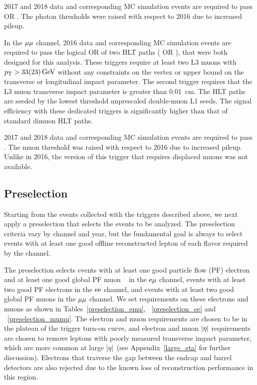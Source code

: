 2017 and 2018 data and corresponding MC simulation events are required to pass  OR  . The photon \ET thresholds were raised with respect to 2016 due to increased pileup.

In the ${\mu}{\mu}$ channel, 2016 data and corresponding MC simulation events are required to pass the logical OR of two HLT paths ( OR ), that were both designed for this analysis. These triggers require at least two L3 muons with $p_{\mathrm{T}}>33(23)\,\text{Ge\hspace{-.08em}V}$ without any constraints on the vertex or upper bound on the transverse or longitudinal impact parameter. The second trigger requires that the L3 muon transverse impact parameter is greater than 0.01~\unit{cm}. The HLT paths are seeded by the lowest \pt threshold unprescaled double-muon L1 seeds. The signal efficiency with these dedicated triggers is significantly higher than that of standard dimuon HLT paths.

2017 and 2018 data and corresponding MC simulation events are required to pass . The muon \pt threshold was raised with respect to 2016 due to increased pileup. Unlike in 2016, the version of this trigger that requires displaced muons was not available.


\subsection{Preselection}
\label{preselection}
Starting from the events collected with the triggers described above, we next apply a preselection that selects the events to be analyzed. The preselection criteria vary by channel and year, but the fundamental goal is always to select events with at least one good offline reconstructed lepton of each flavor required by the channel. 

The preselection selects events with at least one good particle flow (PF) electron and at least one good global PF muon ~\cite{CMS-PRF-14-001} in the $\mathrm{e}{\mu}$ channel, events with at least two good PF electrons in the $\mathrm{e}\mathrm{e}$ channel, and events with at least two good global PF muons in the ${\mu}{\mu}$ channel.  We set requirements on these electrons and muons as shown in Tables~\ref{preselection_emu}, ~\ref{preselection_ee} and ~\ref{preselection_mumu}. The electron and muon \pt  requirements are chosen to be in the plateau of the trigger turn-on curve, and electron and muon $\lvert \eta \rvert$ requirements are chosen to remove leptons with poorly measured transverse impact parameter, which are more common at large $\lvert \eta \rvert$ (see Appendix~\ref{large_eta} for further discussion). Electrons that traverse the gap between the endcap and barrel detectors are also rejected due to the known loss of reconstruction performance in this region.

